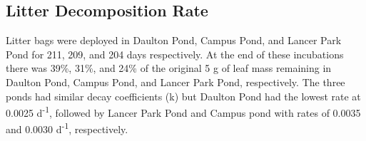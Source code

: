 \subsection{Litter Decomposition Rate}

Litter bags were deployed in Daulton Pond, Campus Pond, and Lancer Park Pond for 211, 209, and 204 days respectively. At the end of these incubations there was 39\%, 31\%, and 24\% of the original 5 g of leaf mass remaining in Daulton Pond, Campus Pond, and Lancer Park Pond, respectively. The three ponds had similar decay coefficients (k) but Daulton Pond had the lowest rate at 0.0025 d\textsuperscript{-1}, followed by Lancer Park Pond and Campus pond with rates of 0.0035 and 0.0030 d\textsuperscript{-1}, respectively.  




  
  
